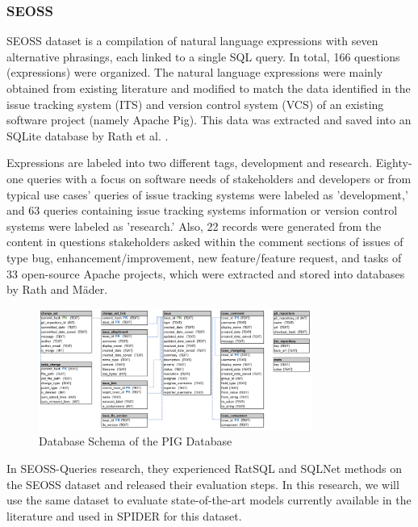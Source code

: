 \subsubsection{SEOSS}

SEOSS dataset is a compilation of natural language expressions with seven alternative phrasings, each linked to a single SQL query. In total, 166 questions (expressions) were organized. The natural language expressions were mainly obtained from existing literature and modified to match the data identified in the issue tracking system (ITS) and version control system (VCS) of an existing software project (namely Apache Pig). This data was extracted and saved into an SQLite database by Rath et al. \cite{RATH2019104005}.

Expressions are labeled into two different tags, development and research. Eighty-one queries with a focus on software needs of stakeholders and developers or from typical use cases' queries of issue tracking systems were labeled as 'development,' and 63 queries containing issue tracking systems information or version control systems were labeled as 'research.' Also, 22 records were generated from the content in questions stakeholders asked within the comment sections of issues of type bug, enhancement/improvement, new feature/feature request, and tasks of 33 open-source Apache projects, which were extracted and stored into databases by Rath and Mäder\cite{RATH2019104005}.

\begin{figure}[htb]
    \centering
    \includegraphics[width=0.8\textwidth]{pics/seoss/pig.png}
    \caption{Database Schema of the PIG Database \cite{TOMOVA2022108211}}
    \label{fig:SESS}
\end{figure}


In SEOSS-Queries\cite{TOMOVA2022108211} research, they experienced RatSQL and SQLNet methods on the SEOSS dataset and released their evaluation steps. In this research, we will use the same dataset to evaluate state-of-the-art models currently available in the literature and used in SPIDER for this dataset.
